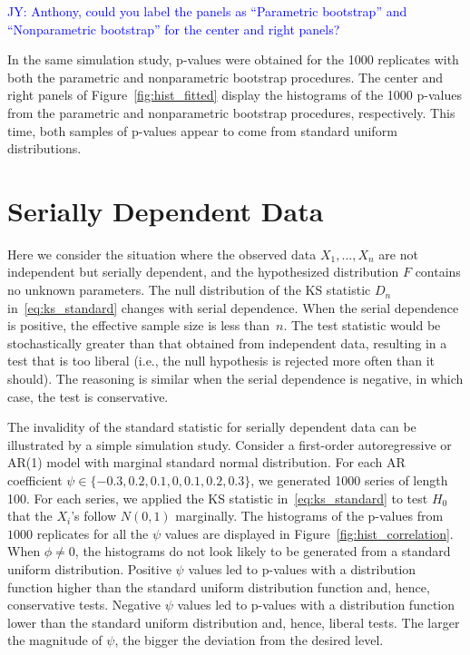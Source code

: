 \documentclass[12pt, letterpaper, titlepage]{article}
\newcommand{\jy}[1]{\textcolor{blue}{JY: #1}}
\begin{document}
\jy{Anthony, could you label the panels as ``Parametric bootstrap'' and
  ``Nonparametric bootstrap'' for the center and right panels?}

In the same simulation study, p-values were obtained for the 1000 replicates
with both the parametric and nonparametric bootstrap procedures. The center and
right panels of Figure~\ref{fig:hist_fitted} display the histograms of the 1000
p-values from the parametric and nonparametric bootstrap procedures,
respectively. This time, both samples of p-values appear to come from
standard uniform distributions.

\section{Serially Dependent Data}
\label{sec:dependence}

Here we consider the situation where the observed data $X_1, \ldots, X_n$ are
not independent but serially dependent, and the hypothesized distribution $F$
contains no unknown parameters. The null distribution of the KS statistic $D_n$
in~\eqref{eq:ks_standard} changes with serial dependence.
When the serial dependence is
positive, the effective sample size is less than~$n$. The test statistic
would be stochastically greater than that obtained from independent data, 
resulting in a test that is too liberal (i.e., the null hypothesis is rejected
more often than it should). The reasoning is similar when the serial dependence 
is negative, in which case, the test is conservative.


The invalidity of the standard statistic for serially dependent data can be
illustrated by a simple simulation study. Consider a first-order autoregressive
or AR(1) model with marginal standard normal distribution. For each AR
coefficient $\psi \in \{-0.3, 0.2, 0.1, 0, 0.1, 0.2, 0.3\}$, we generated 1000
series of length 100. For each series, we applied the KS statistic
in~\eqref{eq:ks_standard} to test $H_0$ that the $X_i$'s follow $N(0, 1)$
marginally. The histograms of the p-values from $1000$ replicates for all the
$\psi$ values are displayed in Figure~\ref{fig:hist_correlation}. When
$\phi \ne 0$, the histograms do not look likely to be generated from a standard
uniform distribution. Positive $\psi$ values led to p-values with a distribution
function higher than the standard uniform distribution function and, hence,
conservative tests. Negative $\psi$ values led to p-values with a distribution
function lower than the standard uniform distribution and, hence, liberal
tests. The larger the magnitude of
$\psi$, the bigger the deviation from the desired level.
\end{document}
